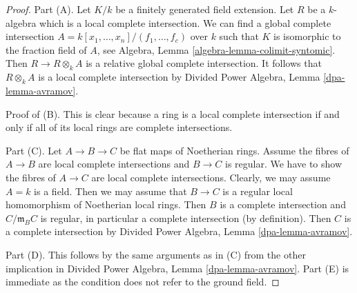 \documentclass[10pt,a4paper]{amsart}
\theoremstyle{plain}
\theoremstyle{definition}
\theoremstyle{remark}
\numberwithin{equation}{subsection}
\begin{document}
\begin{proof}
Part (A). Let $K/k$ be a finitely generated field extension.
Let $R$ be a $k$-algebra which is a local complete intersection.
We can find a global complete intersection
$A = k[x_1, \ldots, x_n]/(f_1, \ldots, f_c)$
over $k$ such that $K$ is isomorphic to the fraction field of $A$, see
Algebra, Lemma \ref{algebra-lemma-colimit-syntomic}.
Then $R \to R \otimes_k A$ is a relative global complete intersection.
It follows that $R \otimes_k A$ is a local complete intersection
by Divided Power Algebra, Lemma \ref{dpa-lemma-avramov}.

\medskip\noindent
Proof of (B). This is clear
because a ring is a local complete intersection if and only if all of its
local rings are complete intersections.

\medskip\noindent
Part (C). Let $A \to B \to C$ be flat maps of Noetherian rings.
Assume the fibres of $A \to B$ are local complete intersections
and $B \to C$ is regular. We have to show the fibres of $A \to C$
are local complete intersections. Clearly, we may assume $A = k$ is a field.
Then we may assume that $B \to C$ is a regular local homomorphism
of Noetherian local rings. Then $B$ is a complete intersection and
$C/\mathfrak m_B C$ is regular, in particular a complete intersection
(by definition). Then $C$ is a complete intersection by
Divided Power Algebra, Lemma \ref{dpa-lemma-avramov}.

\medskip\noindent
Part (D). This follows by the same arguments as in (C) from
the other implication in
Divided Power Algebra, Lemma \ref{dpa-lemma-avramov}.
Part (E) is immediate as the condition does not refer to the ground
field.
\end{proof}
\end{document}
